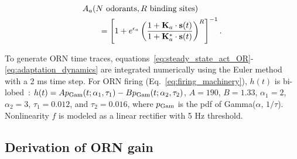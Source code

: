 \documentclass[9pt,lineno]{elife}
\begin{document}
\begin{align}
&A_a(N \textup { odorants}, R \textup { binding sites}) \nonumber \\
&\qquad = \left[1 + e^{\epsilon_a}\left(\frac{1 + \mathbf{K}_a\cdot\mathbf{s}(t)}{1 + \mathbf{K}^*_a\cdot\mathbf{s}(t)}\right)^R\right]^{-1}. 
\end{align} 




To generate ORN time traces, equations~\ref{eq:steady_state_act_OR}-\ref{eq:adaptation_dynamics} are integrated numerically using the Euler method with a 2 ms time step. For ORN firing (Eq.~\ref{eq:firing_machinery}), $h(t)$ is bi-lobed~\citep{martelli}: $h(t) = Ap_{\textup{Gam}}(t; \alpha_1, \tau_1) - Bp_{\textup{Gam}}(t; \alpha_2, \tau_2)$, $A = 190$, $B = 1.33$,  $\alpha_1=2$, $\alpha_2=3$, $\tau_1 = 0.012$, and $\tau_2 = 0.016$, where $p_{\textup{Gam}}$ is the pdf of Gamma($\alpha$, $1/\tau$). Nonlinearity $f$ is modeled as a linear rectifier with 5 Hz threshold. \\




\subsection{Derivation of ORN gain} 
\end{document}
